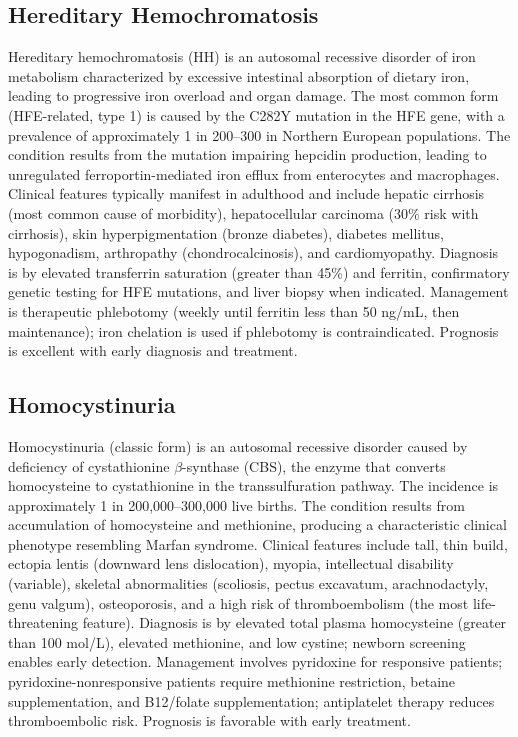 \subsection{Hereditary Hemochromatosis}
\label{sec:nutrition:Hereditary Hemochromatosis}
Hereditary hemochromatosis (HH) is an autosomal recessive disorder of iron metabolism characterized by excessive intestinal absorption of dietary iron, leading to progressive iron overload and organ damage. The most common form (HFE-related, type 1) is caused by the C282Y mutation in the HFE gene, with a prevalence of approximately 1 in 200--300 in Northern European populations. The condition results from the mutation impairing hepcidin production, leading to unregulated ferroportin-mediated iron efflux from enterocytes and macrophages. Clinical features typically manifest in adulthood and include hepatic cirrhosis (most common cause of morbidity), hepatocellular carcinoma (30\% risk with cirrhosis), skin hyperpigmentation (bronze diabetes), diabetes mellitus, hypogonadism, arthropathy (chondrocalcinosis), and cardiomyopathy. Diagnosis is by elevated transferrin saturation (greater than 45\%) and ferritin, confirmatory genetic testing for HFE mutations, and liver biopsy when indicated. Management is therapeutic phlebotomy (weekly until ferritin less than 50 ng/mL, then maintenance); iron chelation is used if phlebotomy is contraindicated. Prognosis is excellent with early diagnosis and treatment.

\subsection{Homocystinuria}
\label{sec:Homocystinuria}
Homocystinuria (classic form) is an autosomal recessive disorder caused by deficiency of cystathionine $\beta$-synthase (CBS), the enzyme that converts homocysteine to cystathionine in the transsulfuration pathway. The incidence is approximately 1 in 200,000--300,000 live births. The condition results from accumulation of homocysteine and methionine, producing a characteristic clinical phenotype resembling Marfan syndrome. Clinical features include tall, thin build, ectopia lentis (downward lens dislocation), myopia, intellectual disability (variable), skeletal abnormalities (scoliosis, pectus excavatum, arachnodactyly, genu valgum), osteoporosis, and a high risk of thromboembolism (the most life-threatening feature). Diagnosis is by elevated total plasma homocysteine (greater than 100 \textmu mol/L), elevated methionine, and low cystine; newborn screening enables early detection. Management involves pyridoxine for responsive patients; pyridoxine-nonresponsive patients require methionine restriction, betaine supplementation, and B12/folate supplementation; antiplatelet therapy reduces thromboembolic risk. Prognosis is favorable with early treatment.

